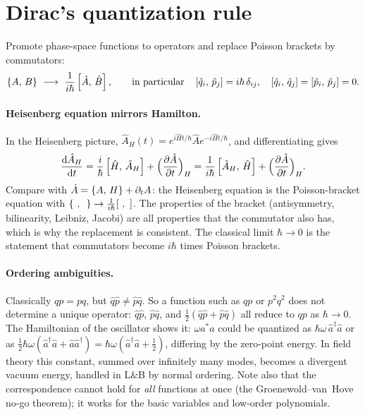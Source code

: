 \documentclass[11pt]{article}
\begin{document}
\section{Dirac's quantization rule}
\label{sec:dirac}

\begin{keyresult}
Promote phase-space functions to operators and replace Poisson brackets by commutators:
\begin{equation}
 \pb AB\ \longrightarrow\ \frac1{i\hbar}\comm{\hat A}{\hat B},\qquad\text{in particular}\quad \comm{\hat q_i}{\hat p_j}=i\hbar\,\delta_{ij},\quad\comm{\hat q_i}{\hat q_j}=\comm{\hat p_i}{\hat p_j}=0 .
\end{equation}
\end{keyresult}

\paragraph{Heisenberg equation mirrors Hamilton.} In the Heisenberg picture, $\hat A_H(t)=e^{i\hat Ht/\hbar}\hat Ae^{-i\hat Ht/\hbar}$, and differentiating gives
\begin{equation}
 \frac{\mathrm{d} \hat A_H}{\mathrm{d} t}=\frac i\hbar\left[\hat H,\,\hat A_H\right]+\Bigl(\frac{\partial \hat A}{\partial t}\Bigr)_H=\frac1{i\hbar}\left[\hat A_H,\,\hat H\right]+\Bigl(\frac{\partial \hat A}{\partial t}\Bigr)_H .
\end{equation}
Compare with $\dot A=\left\{A,\,H\right\}+\partial_tA$: the Heisenberg equation is the Poisson-bracket equation with $\pb{\ }{\ }\to\frac1{i\hbar}[\ ,\ ]$. The properties of the bracket (antisymmetry, bilinearity, Leibniz, Jacobi) are all properties that the commutator also has, which is why the replacement is consistent. The classical limit $\hbar\to0$ is the statement that commutators become $i\hbar$ times Poisson brackets.

\paragraph{Ordering ambiguities.} Classically $qp=pq$, but $\hat q\hat p\neq\hat p\hat q$. So a function such as $qp$ or $p^2q^2$ does not determine a unique operator: $\hat q\hat p$, $\hat p\hat q$, and $\tfrac12(\hat q\hat p+\hat p\hat q)$ all reduce to $qp$ as $\hbar\to0$. The Hamiltonian of the oscillator shows it: $\omega a^*a$ could be quantized as $\hbar\omega\,\hat a^\dagger\hat a$ or as $\tfrac12\hbar\omega(\hat a^\dagger\hat a+\hat a\hat a^\dagger)=\hbar\omega(\hat a^\dagger\hat a+\tfrac12)$, differing by the zero-point energy. In field theory this constant, summed over infinitely many modes, becomes a divergent vacuum energy, handled in L\&B by normal ordering. Note also that the correspondence cannot hold for \emph{all} functions at once (the Groenewold--van~Hove no-go theorem); it works for the basic variables and low-order polynomials.
\end{document}
